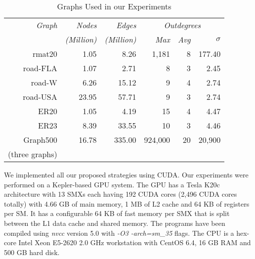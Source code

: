 \begin{table}
\centering
\caption{Graphs Used in our Experiments}
\footnotesize
\begin{tabular}{|r|r|r|rrr|}
\hline%
{\em Graph} 	& {\em Nodes} 		& {\em Edges} 		& \multicolumn{3}{c|}{\em Outdegrees}	\\
 		& {\em (Million)}	& {\em (Million)}	& {\em Max}	& {\em Avg}	& $\sigma$ \\
\hline\hline
rmat20 & 1.05 & 8.26 & 1,181 & 8 & 177.40 \\
\hline
road-FLA & 1.07 & 2.71 & 8 & 3 & 2.45 \\
road-W & 6.26 & 15.12 & 9 & 4 & 2.74 \\
road-USA & 23.95 & 57.71 & 9 & 3 & 2.74 \\
\hline
ER20 & 1.05 & 4.19 & 15 & 4 & 4.47 \\
ER23 & 8.39 & 33.55 & 10 & 3 & 4.46 \\
\hline
Graph500 & 16.78 & 335.00 & 924,000 & 20 & 20,900 \\
(three graphs) &  &  &  &  &  \\
\hline%
\end{tabular}
\label{graph_properties}
\end{table}

We implemented all our proposed strategies using CUDA.
Our experiments were performed on a Kepler-based GPU system. 
The GPU has a Tesla K20c architecture with 13 SMXs each having 192 CUDA cores (2,496 CUDA cores totally) with 4.66 GB of main memory, 1 MB of L2 cache and 64 KB of registers per SM.  
It has a configurable 64 KB of fast memory per SMX that is split between the L1 data cache and shared memory. 
The programs have been compiled using \textit{nvcc} version 5.0 with \textit{-O3 -arch=sm\_35} flags. 
The CPU is a hex-core Intel Xeon E5-2620 2.0 GHz workstation with CentOS 6.4, 16 GB RAM and 500 GB hard disk.

\newcommand{\figurewidth}{0.25}

\begin {figure*}
\centering
{}
\caption{Comparison of Load Balancing Strategies for \textbf{SSSP}} %
\label{overall-comparisons-sssp}
\end{figure*}

